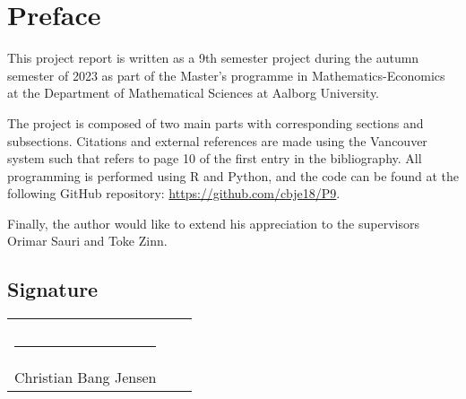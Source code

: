 \section*{Preface}


This project report is written as a 9th semester project during the autumn semester of 2023 as part of the Master's programme in Mathematics-Economics at the Department of Mathematical Sciences at Aalborg University.


The project is composed of two main parts with corresponding sections and subsections. Citations and external references are made using the Vancouver system such that \cite[p.~10]{bollerslev} refers to page 10 of the first entry in the bibliography. All programming is performed using R and Python, and the code can be found at the following GitHub repository: \url{https://github.com/cbje18/P9}.


Finally, the author would like to extend his appreciation to the supervisors Orimar Sauri and Toke Zinn.
\bigskip
\subsection*{Signature}
\begin{tabular}{lcl}
    & &\\
    & &\\
    \rule{7cm}{1pt} & \hspace{0.5cm} \\
    \vspace{1.5cm}
    Christian Bang Jensen \\
\end{tabular}
\vspace{1cm}
